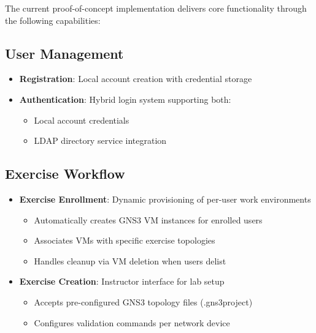   The current proof-of-concept implementation delivers core functionality through the following capabilities:

  \subsection{User Management}
    \begin{itemize}
        \item \textbf{Registration}: Local account creation with credential storage
        \item \textbf{Authentication}: Hybrid login system supporting both:
        \begin{itemize}
            \item Local account credentials
            \item LDAP directory service integration
        \end{itemize}
    \end{itemize}

  \subsection{Exercise Workflow}
    \begin{itemize}
        \item \textbf{Exercise Enrollment}: Dynamic provisioning of per-user work environments
        \begin{itemize}
            \item Automatically creates GNS3 VM instances for enrolled users
            \item Associates VMs with specific exercise topologies
            \item Handles cleanup via VM deletion when users delist
        \end{itemize}
        \item \textbf{Exercise Creation}: Instructor interface for lab setup
        \begin{itemize}
            \item Accepts pre-configured GNS3 topology files (.gns3project)
            \item Configures validation commands per network device
        \end{itemize}
    \end{itemize}

